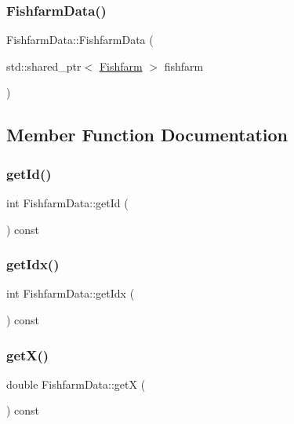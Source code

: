 \subsubsection{\texorpdfstring{FishfarmData()}{FishfarmData()}}
{\footnotesize\ttfamily Fishfarm\+Data\+::\+Fishfarm\+Data (\begin{DoxyParamCaption}\item[{std\+::shared\+\_\+ptr$<$ \mbox{\hyperlink{class_fishfarm}{Fishfarm}} $>$}]{fishfarm }\end{DoxyParamCaption})}



\subsection{Member Function Documentation}
\mbox{\label{class_fishfarm_data_a712a5fa81604d4a888a6314b5e3decc2}} 
\subsubsection{\texorpdfstring{getId()}{getId()}}
{\footnotesize\ttfamily int Fishfarm\+Data\+::get\+Id (\begin{DoxyParamCaption}{ }\end{DoxyParamCaption}) const\hspace{0.3cm}{\ttfamily [inline]}}

\mbox{\label{class_fishfarm_data_a4a59751310f4142c90b62df12dcc85b9}} 
\subsubsection{\texorpdfstring{getIdx()}{getIdx()}}
{\footnotesize\ttfamily int Fishfarm\+Data\+::get\+Idx (\begin{DoxyParamCaption}{ }\end{DoxyParamCaption}) const}

\mbox{\label{class_fishfarm_data_acdaed3df25a88e94c7eaeb5dead7fba9}} 
\subsubsection{\texorpdfstring{getX()}{getX()}}
{\footnotesize\ttfamily double Fishfarm\+Data\+::getX (\begin{DoxyParamCaption}{ }\end{DoxyParamCaption}) const}

